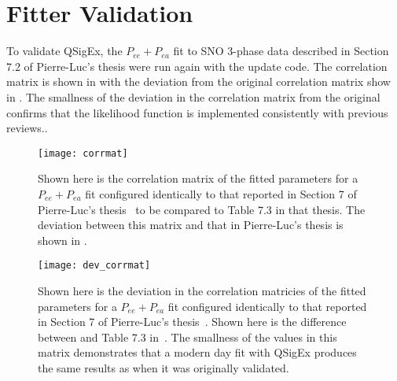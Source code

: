 \section{Fitter Validation}

To validate QSigEx, the $P_{ee} + P_{ea}$ fit to SNO 3-phase data described in Section 7.2 of Pierre-Luc's thesis were run again with the update code. The correlation matrix is shown in  with the deviation from the original correlation matrix show in . The smallness of the deviation in the correlation matrix from the original confirms that the likelihood function is implemented consistently with previous reviews.. 

\begin{figure}
\centering
\texttt{[image: corrmat]} \\
\caption{
Shown here is the correlation matrix of the fitted parameters for a $P_{ee} + P_{ea}$ fit configured identically to that reported in Section 7 of Pierre-Luc's thesis~\cite{plthesis} to be compared to Table 7.3 in that thesis. The deviation between this matrix and that in Pierre-Luc's thesis is shown in .
}
\label{fig:qsigex_pee_pea_fits}
\end{figure}

\begin{figure}
\centering
\texttt{[image: dev\_corrmat]} \\
\caption{
Shown here is the deviation in the correlation matricies of the fitted parameters for a $P_{ee} + P_{ea}$ fit configured identically to that reported in Section 7 of Pierre-Luc's thesis~\cite{plthesis}. Shown here is the difference between  and Table 7.3 in~\cite{plthesis}. The smallness of the values in this matrix demonstrates that a modern day fit with QSigEx produces the same results as when it was originally validated.
}
\label{fig:qsigex_pee_pea_fits_dev}
\end{figure}
